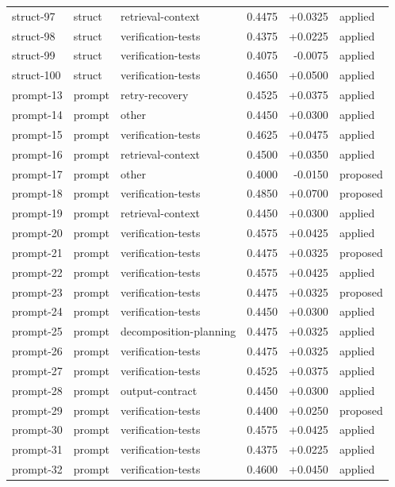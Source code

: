 \begin{center}
\begin{longtable}{llp{5.2cm}rrl}
struct-97 & struct & retrieval-context & 0.4475 & +0.0325 & applied \\
struct-98 & struct & verification-tests & 0.4375 & +0.0225 & applied \\
struct-99 & struct & verification-tests & 0.4075 & -0.0075 & applied \\
struct-100 & struct & verification-tests & 0.4650 & +0.0500 & applied \\
prompt-13 & prompt & retry-recovery & 0.4525 & +0.0375 & applied \\
prompt-14 & prompt & other & 0.4450 & +0.0300 & applied \\
prompt-15 & prompt & verification-tests & 0.4625 & +0.0475 & applied \\
prompt-16 & prompt & retrieval-context & 0.4500 & +0.0350 & applied \\
prompt-17 & prompt & other & 0.4000 & -0.0150 & proposed \\
prompt-18 & prompt & verification-tests & 0.4850 & +0.0700 & proposed \\
prompt-19 & prompt & retrieval-context & 0.4450 & +0.0300 & applied \\
prompt-20 & prompt & verification-tests & 0.4575 & +0.0425 & applied \\
prompt-21 & prompt & verification-tests & 0.4475 & +0.0325 & proposed \\
prompt-22 & prompt & verification-tests & 0.4575 & +0.0425 & applied \\
prompt-23 & prompt & verification-tests & 0.4475 & +0.0325 & proposed \\
prompt-24 & prompt & verification-tests & 0.4450 & +0.0300 & applied \\
prompt-25 & prompt & decomposition-planning & 0.4475 & +0.0325 & applied \\
prompt-26 & prompt & verification-tests & 0.4475 & +0.0325 & applied \\
prompt-27 & prompt & verification-tests & 0.4525 & +0.0375 & applied \\
prompt-28 & prompt & output-contract & 0.4450 & +0.0300 & applied \\
prompt-29 & prompt & verification-tests & 0.4400 & +0.0250 & proposed \\
prompt-30 & prompt & verification-tests & 0.4575 & +0.0425 & applied \\
prompt-31 & prompt & verification-tests & 0.4375 & +0.0225 & applied \\
prompt-32 & prompt & verification-tests & 0.4600 & +0.0450 & applied \\

\end{longtable}
\end{center}
